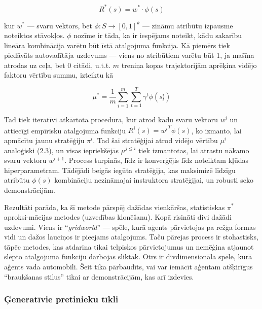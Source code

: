 \documentclass[12pt, a4paper]{article}
\numberwithin{equation}{section} %
\begin{document}
\begin{equation}
    R^*(s) = w^* \cdot \phi(s)
\end{equation}

kur $w^*$ --- svaru vektors, bet $\phi: S \rightarrow [0,1]^k$ --- zināmu atribūtu izpausme noteiktos stāvokļos. $\phi$ nozīme ir tāda, ka ir iespējams noteikt, kādu sakarību lineāra kombinācija varētu būt īstā atalgojuma funkcija. Kā piemērs tiek piedāvāts autovadītāja uzdevums --- viens no atribūtiem varētu būt 1, ja mašīna atrodas uz ceļa, bet 0 citādi, u.t.t. $m$ treniņa kopas trajektorijām aprēķina vidējo faktoru vērtību summu, izteiktu kā

\begin{equation}
    \mu^* = \frac{1}{m}\sum_{i=1}^m\sum_{t=1}^T \gamma^t \phi(s^i_t)
\end{equation}

Tad tiek iteratīvi atkārtota procedūra, kur atrod kādu svaru vektoru $w^{i}$ un attiecīgi empīrisku atalgojuma funkciju $R^{i}(s) = {w^{i}}^T\phi(s)$, ko izmanto, lai apmācītu jaunu stratēģiju $\pi^i$. Tad šai stratēģijai atrod vidējo vērtību $\mu^i$ analoģiski (2.3), un visas iepriekšējās $\mu^{j \leq i}$ tiek izmantotas, lai atrastu nākamo svaru vektoru $w^{i+1}$. Process turpinās, līdz ir konverģējis līdz noteiktam kļūdas hiperparametram. Tādējādi beigās iegūta stratēģija, kas maksimizē līdzīgu atribūtu $\phi(s)$ kombināciju nezināmajai instruktora stratēģijai, un robusti seko demonstrācijām.

Rezultāti parāda, ka šī metode pārspēj dažādas vienkāršas, statistiskas $\pi^*$ aproksi-mācijas metodes (uzvedības klonēšanu). Kopā risināti divi dažādi uzdevumi. Viens ir ``\textit{gridworld}'' --- spēle, kurā aģents pārvietojas pa režģa formas vidi un dažos lauciņos ir pieejams atalgojums. Taču pārejas process ir stohastisks, tāpēc metodes, kas atdarina tikai telpiskos pārvietojumus un nemēģina atjaunot slēpto atalgojuma funkciju darbojas sliktāk. Otrs ir divdimensionāla spēle, kurā aģents vada automobili. Šeit tika pārbaudīts, vai var iemācīt aģentam atšķirīgus ``braukšanas stilus'' tikai ar demonstrācijām, kas arī izdevies.

\subsubsection{Ģeneratīvie pretinieku tīkli}
\end{document}
